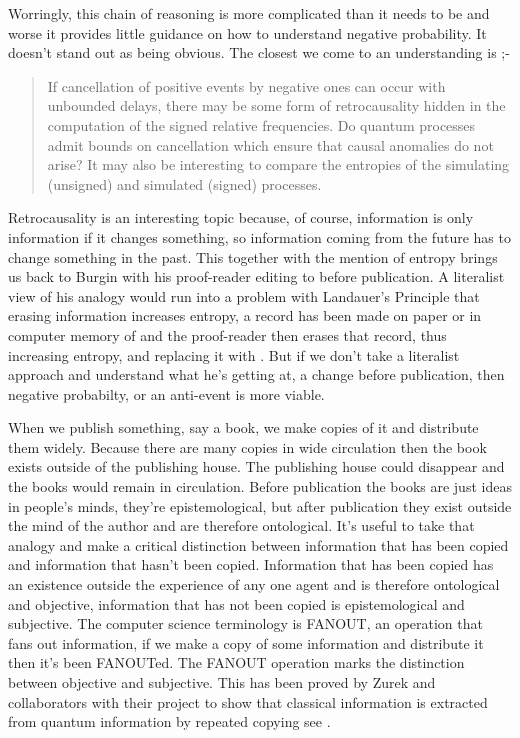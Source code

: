 \documentclass{article}
\begin{document}
Worringly, this chain of reasoning is more complicated than it needs to be and worse it provides little guidance on how to understand negative probability. It doesn't stand out as being obvious. The closest we come to an understanding is ;-
\begin{quotation}
    If cancellation of positive events by negative ones can occur with unbounded delays, there may be some form
of retrocausality hidden in the computation of the signed relative frequencies. Do quantum
processes admit bounds on cancellation which ensure that causal anomalies do not arise? It may
also be interesting to compare the entropies of the simulating (unsigned) and simulated (signed)
processes.
 \par
\hfill \autocite{Abramsky2014}
\end{quotation}
Retrocausality is an interesting topic because, of course, information is only information if it changes something, so information coming from the future has to change something in the past. This together with the mention of entropy brings us back to Burgin with his proof-reader editing  to  before publication. A literalist view of his analogy would run into a problem with Landauer's Principle \autocite{Landauer_1961} that erasing information increases entropy, a record has been made on paper or in computer memory of  and the proof-reader then erases that record, thus increasing entropy, and replacing it with . But if we don't take a literalist approach and understand what he's getting at, a change before publication, then negative probabilty, or an anti-event is more viable. 

When we publish something, say a book,  we make copies of it and distribute them widely. Because there are many copies in wide circulation then the book exists outside of the publishing house. The publishing house could disappear and the books would remain in circulation. Before publication the books are just ideas in people's minds, they're epistemological, but after publication they exist outside the mind of the author and are therefore ontological. It's useful to take that analogy and make a critical distinction between information that has been copied and information that hasn't been copied. Information that has been copied has an existence outside the experience of any one agent and is therefore ontological and objective, information that has not been copied is epistemological and subjective. The computer science terminology is FANOUT, an operation that fans out information, if we make a copy of some information and distribute it then it's been FANOUTed. The FANOUT operation marks the distinction between objective and subjective. This has been proved by Zurek and collaborators with their project to show that classical information is extracted from quantum information by repeated copying see \autocite{zureck_2009, Zurek2002, Oliver_2004}. 
\end{document}
